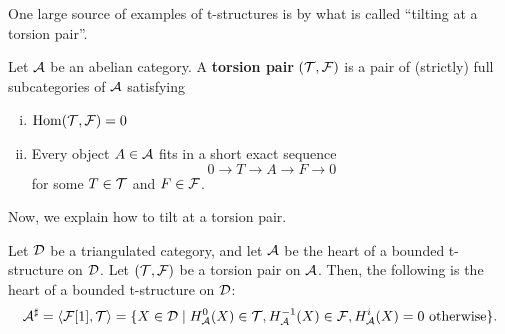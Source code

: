 \documentclass[12pt]{article}
\begin{document}
One large source of examples of t-structures is by what is called ``tilting at a torsion pair''.

\begin{defn}
    Let $\mathcal{A}$ be an abelian category. A \textbf{torsion pair} $(\mathcal{T},\mathcal{F})$ is a pair of (strictly) full subcategories of $\mathcal{A}$ satisfying
    \begin{enumerate}[(i)]
        \item $\mathrm{Hom}(\mathcal{T},\mathcal{F}) = 0$
        \item Every object $A \in \mathcal{A}$ fits in a short exact sequence
        \[0\to T \to A \to F \to 0\]
        for some $T\in \mathcal{T}$ and $F\in \mathcal{F}$.
    \end{enumerate}
\end{defn}

Now, we explain how to tilt at a torsion pair.

\begin{thmdef}
    Let $\mathcal{D}$ be a triangulated category, and let $\mathcal{A}$ be the heart of a bounded t-structure on $\mathcal{D}$. Let $(\mathcal{T},\mathcal{F})$ be a torsion pair on $\mathcal{A}$. Then, the following is the heart of a bounded t-structure on $\mathcal{D}$:
    \[\mathcal{A}^\sharp = \left\langle\mathcal{F}[1],\mathcal{T}\right\rangle = \{X\in \mathcal{D} \mid H_{\mathcal{A}}^0(X) \in \mathcal{T}, H_{\mathcal{A}}^{-1}(X) \in \mathcal{F}, H_{\mathcal{A}}^i(X)=0 \text{ otherwise}\}.\]
\end{thmdef}
\end{document}

